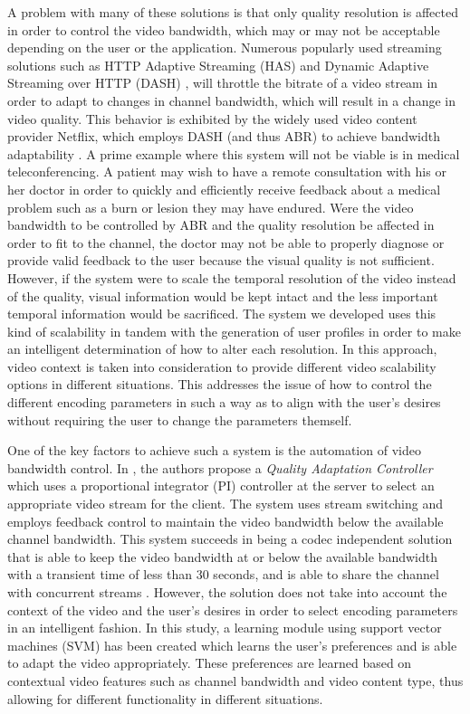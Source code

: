 \documentclass[a4paper,12pt]{article}
\begin{document}
A problem with many of these solutions is that only quality resolution is affected in order to control the video bandwidth, which may or may not be acceptable depending on the user or the application. Numerous popularly used streaming solutions such as HTTP Adaptive Streaming (HAS) \cite{HASQoE} and Dynamic Adaptive Streaming over HTTP (DASH) \cite{DASH},  will throttle the bitrate of a video stream in order to adapt to changes in channel bandwidth, which will result in a change in video quality. This behavior is exhibited by the widely used video content provider Netflix, which employs DASH (and thus ABR) to achieve bandwidth adaptability \cite{Netflix}. A prime example where this system will not be viable is in medical teleconferencing. A patient may wish to have a remote consultation with his or her doctor in order to quickly and efficiently receive feedback about a medical problem such as a burn or lesion they may have endured. Were the video bandwidth to be controlled by ABR and the quality resolution be affected in order to fit to the channel, the doctor may not be able to properly diagnose or provide valid feedback to the user because the visual quality is not sufficient. However, if the system were to scale the temporal resolution of the video instead of the quality, visual information would be kept intact and the less important temporal information would be sacrificed. The system we developed uses this kind of scalability in tandem with the generation of user profiles in order to make an intelligent determination of how to alter each resolution. In this approach, video context is taken into consideration to provide different video scalability options in different situations. This addresses the issue of how to control the different encoding parameters in such a way as to align with the user’s desires without requiring the user to change the parameters themself.

One of the key factors to achieve such a system is the automation of video bandwidth control. In \cite{FeedbackControl}, the authors propose a \emph{Quality Adaptation Controller} which uses a proportional integrator (PI) controller at the server to select an appropriate video stream for the client. The system uses stream switching and employs feedback control to maintain the video bandwidth below the available channel bandwidth. This system succeeds in being a codec independent solution that is able to keep the video bandwidth at or below the available bandwidth with a transient time of less than 30 seconds, and is able to share the channel with concurrent streams \cite{FeedbackControl}. However, the solution does not take into account the context of the video and the user’s desires in order to select encoding parameters in an intelligent fashion. In this study, a learning module using support vector machines (SVM) has been created which learns the user’s preferences and is able to adapt the video appropriately. These preferences are learned based on contextual video features such as channel bandwidth and video content type, thus allowing for different functionality in different situations.
\end{document}
